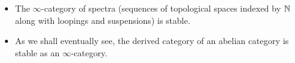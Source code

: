         \begin{example}
            
            \begin{itemize}
                \item The $\infty$-category of spectra (sequences of topological spaces indexed by $\mathbb{N}$ along with loopings and suspensions) is stable.
                \item As we shall eventually see, the derived category of an abelian category is stable as an $\infty$-category.
            \end{itemize}
        \end{example}
        
        \begin{definition} \label{def: triangulated_infinity_categories} 
            

\end{definition}

